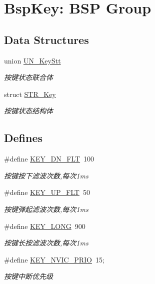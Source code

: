 \hypertarget{group___k_e_y}{\section{\-Bsp\-Key\-: \-B\-S\-P \-Group}
\label{group___k_e_y}
}
\subsection*{\-Data \-Structures}
\begin{DoxyCompactItemize}
\item 
union \hyperlink{union_u_n___key_stt}{\-U\-N\-\_\-\-Key\-Stt}
\begin{DoxyCompactList}\small\item\em 按键状态联合体 \end{DoxyCompactList}\item 
struct \hyperlink{struct_s_t_r___key}{\-S\-T\-R\-\_\-\-Key}
\begin{DoxyCompactList}\small\item\em 按键状态结构体 \end{DoxyCompactList}\end{DoxyCompactItemize}
\subsection*{\-Defines}
\begin{DoxyCompactItemize}
\item 
\#define \hyperlink{group___k_e_y_ga38599380071fb33212aa3fd543bae31b}{\-K\-E\-Y\-\_\-\-D\-N\-\_\-\-F\-L\-T}~100
\begin{DoxyCompactList}\small\item\em 按键按下滤波次数,每次1ms \end{DoxyCompactList}\item 
\#define \hyperlink{group___k_e_y_gae1e078d7683b2244f76e0cec7526899d}{\-K\-E\-Y\-\_\-\-U\-P\-\_\-\-F\-L\-T}~50
\begin{DoxyCompactList}\small\item\em 按键弹起滤波次数,每次1ms \end{DoxyCompactList}\item 
\#define \hyperlink{group___k_e_y_ga69ed1676c835686c30dbdc821661954b}{\-K\-E\-Y\-\_\-\-L\-O\-N\-G}~900
\begin{DoxyCompactList}\small\item\em 按键长按滤波次数,每次1ms \end{DoxyCompactList}\item 
\hypertarget{group___k_e_y_gab3cfff9440c221292481854752c3bc13}{\#define \hyperlink{group___k_e_y_gab3cfff9440c221292481854752c3bc13}{\-K\-E\-Y\-\_\-\-N\-V\-I\-C\-\_\-\-P\-R\-I\-O}~15;}\label{group___k_e_y_gab3cfff9440c221292481854752c3bc13}

\begin{DoxyCompactList}\small\item\em 按键中断优先级 \end{DoxyCompactList}\end{DoxyCompactItemize}
